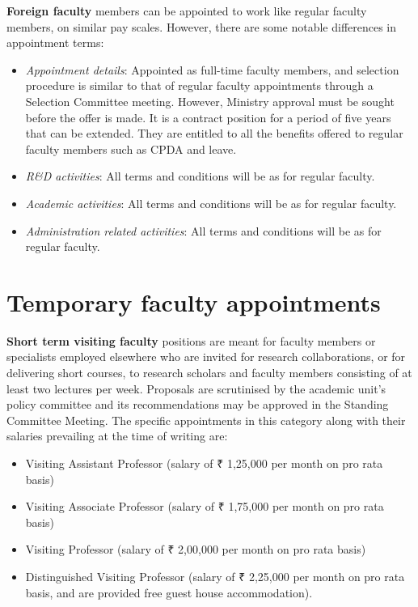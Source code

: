 \documentclass[
  10pt,
  a5paper,
  10pt,
  openany]{amsbook}
\providecommand{\tightlist}{%
  \setlength{\itemsep}{0pt}\setlength{\parskip}{0pt}}
\begin{document}
\textbf{Foreign faculty} members can be appointed to work like regular
faculty members, on similar pay scales. However, there are some notable
differences in appointment terms:

\begin{itemize}
\tightlist
\item
  \emph{Appointment details}: Appointed as full-time faculty members,
  and selection procedure is similar to that of regular faculty
  appointments through a Selection Committee meeting. However, Ministry
  approval must be sought before the offer is made. It is a contract
  position for a period of five years that can be extended. They are
  entitled to all the benefits offered to regular faculty members such
  as CPDA and leave.
\item
  \emph{R\&D activities}: All terms and conditions will be as for
  regular faculty.
\item
  \emph{Academic activities}: All terms and conditions will be as for
  regular faculty.
\item
  \emph{Administration related activities}: All terms and conditions
  will be as for regular faculty.
\end{itemize}

\section{Temporary faculty
appointments}\label{temporary-faculty-appointments}

\textbf{Short term visiting faculty} positions are meant for faculty
members or specialists employed elsewhere who are invited for research
collaborations, or for delivering short courses, to research scholars
and faculty members consisting of at least two lectures per week.
Proposals are scrutinised by the academic unit's policy committee and
its recommendations may be approved in the Standing Committee Meeting.
The specific appointments in this category along with their salaries
prevailing at the time of writing are:

\begin{itemize}
\tightlist
\item
  Visiting Assistant Professor (salary of ₹ 1,25,000 per month on pro
  rata basis)
\item
  Visiting Associate Professor (salary of ₹ 1,75,000 per month on pro
  rata basis)
\item
  Visiting Professor (salary of ₹ 2,00,000 per month on pro rata basis)
\item
  Distinguished Visiting Professor (salary of ₹ 2,25,000 per month on
  pro rata basis, and are provided free guest house accommodation).
\end{itemize}
\end{document}
